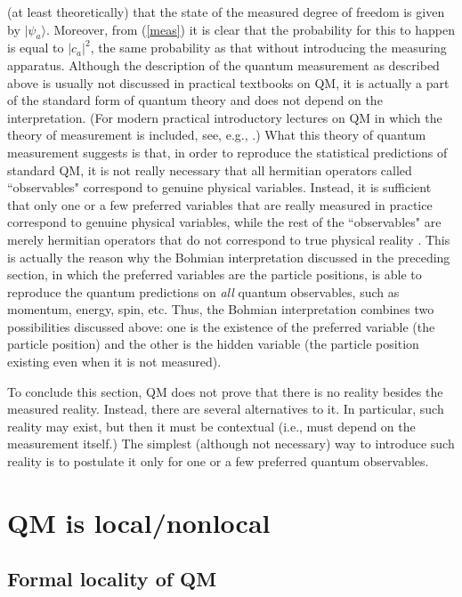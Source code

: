\documentclass[12pt]{article}
\begin{document}
(at least theoretically) that the state 
of the measured degree of freedom is given by $|\psi_a\rangle$. 
Moreover, from (\ref{meas}) it is clear that the probability for 
this to happen is equal to $|c_a|^2$, the same probability   
as that without introducing the measuring apparatus.
Although the description of the quantum measurement as described 
above is usually not discussed in practical textbooks on QM, 
it is actually a part of the standard form of quantum theory
and does not depend on the interpretation. (For modern practical 
introductory lectures on QM in which the theory of measurement
is included, see, e.g., \cite{lectqm}.)  
What this theory of quantum measurement suggests is that, 
in order to reproduce the statistical predictions of standard QM, it is not 
really necessary that all hermitian operators called ``observables" 
correspond to genuine physical variables. Instead, it is 
sufficient that only one or a few preferred variables that are really 
measured in practice correspond to genuine physical variables, 
while the rest of the ``observables" are merely 
hermitian operators that do not correspond to true 
physical reality \cite{naive}. This is actually the reason 
why the Bohmian interpretation discussed in the preceding section,
in which the preferred variables are the particle positions, is able 
to reproduce the quantum predictions on {\em all} 
quantum observables, such as momentum, energy, spin, etc.
Thus, the Bohmian interpretation combines two possibilities discussed 
above: one is the existence of the preferred variable (the particle position) 
and the other is the hidden variable (the particle position existing even 
when it is not measured).

To conclude this section, QM does not prove that there is no 
reality besides the measured reality. Instead, there are several 
alternatives to it. In particular, such reality may exist, 
but then it must be contextual (i.e., must depend 
on the measurement itself.) The simplest (although not necessary) 
way to introduce such reality is to postulate it only for one 
or a few preferred quantum observables.    
  
\section{QM is local/nonlocal}
\label{L/NL}

\subsection{Formal locality of QM}
\end{document}
